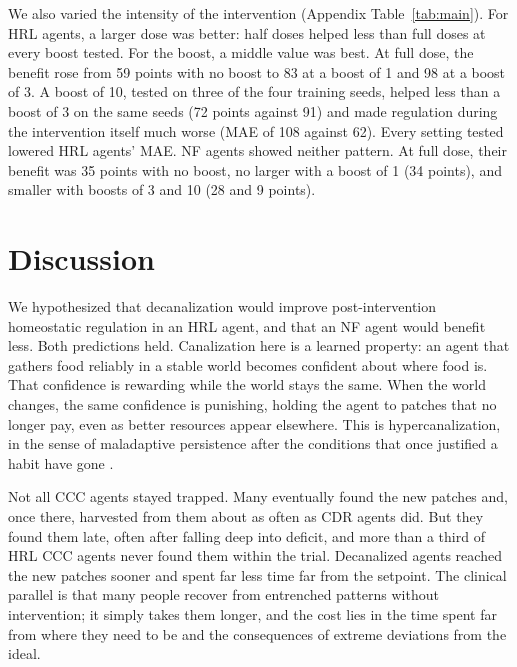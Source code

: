 \documentclass[12pt,fleqn]{article}
\begin{document}
We also varied the intensity of the intervention (Appendix Table~\ref{tab:main}). For HRL agents, a larger dose was better: half doses helped less than full doses at every boost tested. For the boost, a middle value was best. At full dose, the benefit rose from 59 points with no boost to 83 at a boost of 1 and 98 at a boost of 3. A boost of 10, tested on three of the four training seeds, helped less than a boost of 3 on the same seeds (72 points against 91) and made regulation during the intervention itself much worse (MAE of 108 against 62). Every setting tested lowered HRL agents' MAE. NF agents showed neither pattern. At full dose, their benefit was 35 points with no boost, no larger with a boost of 1 (34 points), and smaller with boosts of 3 and 10 (28 and 9 points).


\section{Discussion}\label{model-discussion}

We hypothesized that decanalization would improve post-intervention homeostatic regulation in an HRL agent, and that an NF agent would benefit less. Both predictions held. Canalization here is a learned property: an agent that gathers food reliably in a stable world becomes confident about where food is. That confidence is rewarding while the world stays the same. When the world changes, the same confidence is punishing, holding the agent to patches that no longer pay, even as better resources appear elsewhere. This is hypercanalization, in the sense of maladaptive persistence after the conditions that once justified a habit have gone \citep{carhart-harris_canalization_2023}. 

Not all CCC agents stayed trapped. Many eventually found the new patches and, once there, harvested from them about as often as CDR agents did. But they found them late, often after falling deep into deficit, and more than a third of HRL CCC agents never found them within the trial. Decanalized agents reached the new patches sooner and spent far less time far from the setpoint. The clinical parallel is that many people recover from entrenched patterns without intervention; it simply takes them longer, and the cost lies in the time spent far from where they need to be and the consequences of extreme deviations from the ideal.
\end{document}
